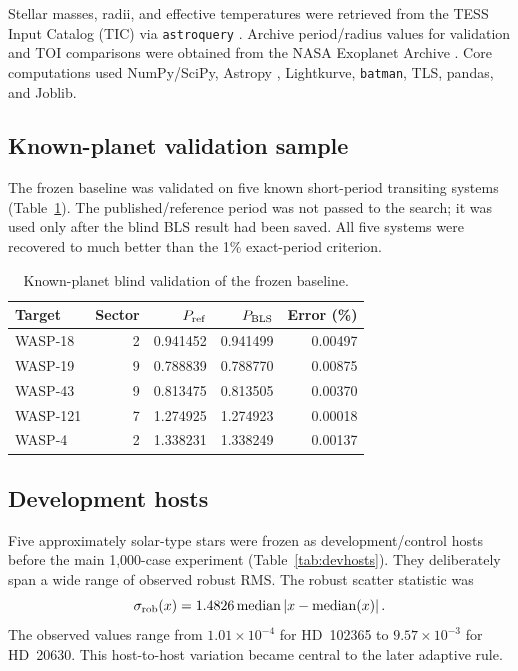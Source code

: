 \documentclass[11pt]{article}
\begin{document}
Stellar masses, radii, and effective temperatures were retrieved from the TESS Input Catalog (TIC) via \texttt{astroquery} \cite{Stassun2019,Ginsburg2019}. Archive period/radius values for validation and TOI comparisons were obtained from the NASA Exoplanet Archive \cite{Akeson2013}. Core computations used NumPy/SciPy, Astropy \cite{Astropy2022}, Lightkurve, \texttt{batman}, TLS, pandas, and Joblib.

\subsection{Known-planet validation sample}
The frozen baseline was validated on five known short-period transiting systems (Table~\ref{tab:validation}). The published/reference period was not passed to the search; it was used only after the blind BLS result had been saved. All five systems were recovered to much better than the 1\% exact-period criterion.

\begin{table}[htbp]
\centering
\caption{Known-planet blind validation of the frozen baseline.}
\label{tab:validation}
\small
\begin{tabular}{lrrrr}
\toprule
Target & Sector & $P_{\rm ref}$ & $P_{\rm BLS}$ & Error (\%)\\
\midrule
WASP-18  & 2 & 0.941452 & 0.941499 & 0.00497\\
WASP-19  & 9 & 0.788839 & 0.788770 & 0.00875\\
WASP-43  & 9 & 0.813475 & 0.813505 & 0.00370\\
WASP-121 & 7 & 1.274925 & 1.274923 & 0.00018\\
WASP-4   & 2 & 1.338231 & 1.338249 & 0.00137\\
\bottomrule
\end{tabular}
\end{table}

\subsection{Development hosts}
Five approximately solar-type stars were frozen as development/control hosts before the main 1,000-case experiment (Table~\ref{tab:devhosts}). They deliberately span a wide range of observed robust RMS. The robust scatter statistic was
\begin{equation}
\sigma_{\rm rob}(x)=1.4826\,\mathrm{median}\left|x-\mathrm{median}(x)\right|.
\end{equation}
The observed values range from $1.01\times10^{-4}$ for HD~102365 to $9.57\times10^{-3}$ for HD~20630. This host-to-host variation became central to the later adaptive rule.
\end{document}
